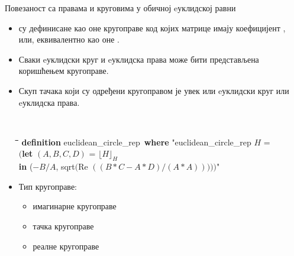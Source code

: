 \documentclass[slidestop, compress, mathserif, containsverbatim, xcolor=dvipsnames]{beamer}
\newcommand{\Repcm}[1]{\ensuremath{\lfloor#1\rfloor_{H}}}
\begin{document}
\begin{frame}{Повезаност са правама и круговима у обичној eуклидској равни}
  \begin{itemize}
  \item {} су дефинисане као оне кругоправе код којих
    матрице имају коефицијент , или, еквивалентно
    као оне .
  \item Сваки eуклидски круг и eуклидска права може бити представљена
    коришћењем кругоправе.
  \item Скуп тачака који су одређени кругоправом је увек или eуклидски
    круг или eуклидска права.
    \begin{footnotesize} {\tt
        \begin{tabbing}
          \hspace{5mm}\=\hspace{5mm}\=\hspace{5mm}\=\hspace{5mm}\=\hspace{5mm}\=\kill
          {\bf definition} euclidean\_circle\_rep\ {\bf where} "{}euclidean\_circle\_rep $H$ = \\
      \> $(${\bf l}\={\bf et} $(A, B, C, D)$ = $\Repcm{H}$\\
      \>\> {\bf in} ($-B/A$, sqrt$($Re $((B*C - A*D)/(A*A))))$$)$"   \end{tabbing}
    } \end{footnotesize}
  \item Тип кругоправе: 
   \begin{itemize}
   \item имагинарне кругоправе
   \item тачка кругоправе
   \item реалне кругоправе
   \end{itemize}
  \end{itemize}
\end{frame}
\end{document}
